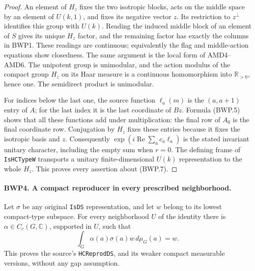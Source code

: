 \begin{proof}
An element of \(H_z\) fixes the two isotropic blocks, acts on the
middle space by an element of \(U(k,1)\), and fixes its negative
vector \(z\).  Its restriction to \(z^\perp\) identifies this
group with \(U(k)\).  Reading the induced middle block of an element
of \(S\) gives its unique \(H_z\) factor, and the remaining
factor has exactly the columns in BWP1.  These readings are continuous;
equivalently the flag and middle-action equations show closedness.
The same argument is the local form of AMD4--AMD6.  The unipotent
group is unimodular, and the action modulus of the compact group
\(H_z\) on its Haar measure is a continuous homomorphism into
\(\mathbb R_{>0}\), hence one.  The semidirect product is unimodular.

For indices below the last one, the source function \(\ell_a(m)\)
is the \((a,a+1)\) entry of \(A\); for the last index it is
the last coordinate of \(Bz\).  Formula (BWP.5) shows that all
these functions add under multiplication: the final row of \(A_0\)
is the final coordinate row.  Conjugation by \(H_z\) fixes these
entries because it fixes the isotropic basis and \(z\).
Consequently \(\exp(i\operatorname{Re}\sum_a c_a\ell_a)\)
is the stated invariant unitary character, including the empty sum
when \(r=0\).  The defining frame of \texttt{IsHCTypeW}
transports a unitary finite-dimensional \(U(k)\) representation
to the whole \(H_z\).  This proves every assertion about (BWP.7).
\end{proof}

\paragraph{BWP4. A compact reproducer in every prescribed neighborhood.}
\label{claim:BWP4}
Let \(\sigma\) be any original \texttt{IsDS} representation,
and let \(w\) belong to its lowest compact-type subspace.  For
every neighborhood \(U\) of the identity there is
\(\alpha\in C_c(G,\mathbb C)\), supported in \(U\), such that
\[
 \int_G\alpha(a)\sigma(a)w\,d\mu_G(a)=w.
 \tag{BWP.8}
\]
This proves the source's \texttt{HCReprodDS}, and its weaker
compact measurable versions, without any gap assumption.


